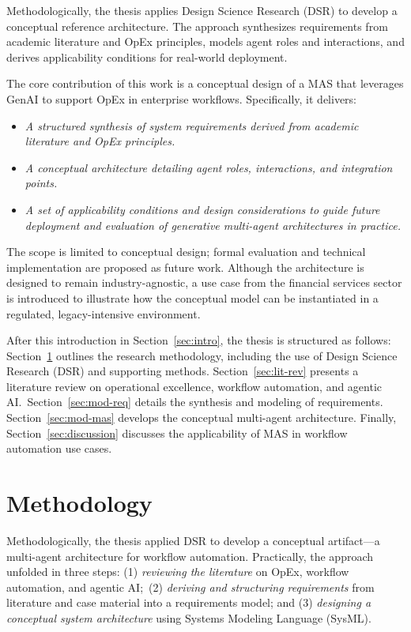 Methodologically, the thesis applies Design Science Research (DSR) to develop a conceptual reference architecture. The approach synthesizes requirements from academic literature and OpEx principles, models agent roles and interactions, and derives applicability conditions for real-world deployment.

The core contribution of this work is a conceptual design of a MAS that leverages GenAI to support OpEx in enterprise workflows. Specifically, it delivers:
\begin{itemize}
    \item \emph{A structured synthesis of system requirements derived from academic literature and OpEx principles.}
    \item \emph{A conceptual architecture detailing agent roles, interactions, and integration points.}
    \item \emph{A set of applicability conditions and design considerations to guide future deployment and evaluation of generative multi-agent architectures in practice.}
\end{itemize}

The scope is limited to conceptual design; formal evaluation and technical implementation are proposed as future work. Although the architecture is designed to remain industry-agnostic, a use case from the financial services sector is introduced to illustrate how the conceptual model can be instantiated in a regulated, legacy-intensive environment.

After this introduction in Section~\ref{sec:intro}, the thesis is structured as follows: Section~\ref{sec:method} outlines the research methodology, including the use of Design Science Research (DSR) and supporting methods. Section~\ref{sec:lit-rev} presents a literature review on operational excellence, workflow automation, and agentic AI.~Section~\ref{sec:mod-req} details the synthesis and modeling of requirements. Section~\ref{sec:mod-mas} develops the conceptual multi-agent architecture. Finally, Section~\ref{sec:discussion} discusses the applicability of MAS in workflow automation use cases.

\section{Methodology}\label{sec:method}
Methodologically, the thesis applied DSR to develop a conceptual artifact---a multi-agent architecture for workflow automation. Practically, the approach unfolded in three steps: (1) \emph{reviewing the literature} on OpEx, workflow automation, and agentic AI;~(2) \emph{deriving and structuring requirements} from literature and case material into a requirements model; and (3) \emph{designing a conceptual system architecture} using Systems Modeling Language (SysML).

